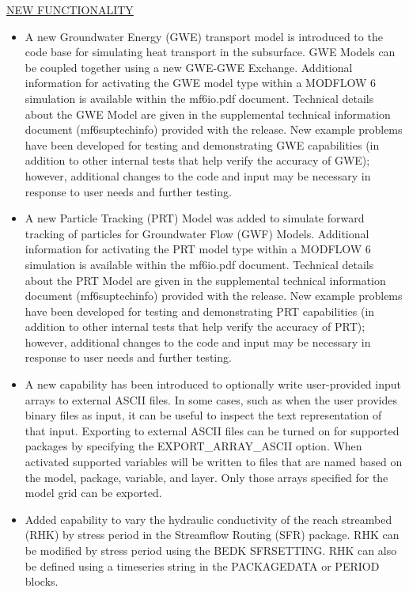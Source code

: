 	
	\item \currentmodflowversion
	
	\underline{NEW FUNCTIONALITY}
	\begin{itemize}
		\item A new Groundwater Energy (GWE) transport model is introduced to the code base for simulating heat transport in the subsurface.  GWE Models can be coupled together using a new GWE-GWE Exchange.  Additional information for activating the GWE model type within a MODFLOW 6 simulation is available within the mf6io.pdf document.  Technical details about the GWE Model are given in the supplemental technical information document (mf6suptechinfo) provided with the release.  New example problems have been developed for testing and demonstrating GWE capabilities (in addition to other internal tests that help verify the accuracy of GWE); however, additional changes to the code and input may be necessary in response to user needs and further testing.
		\item A new Particle Tracking (PRT) Model was added to simulate forward tracking of particles for Groundwater Flow (GWF) Models.  Additional information for activating the PRT model type within a MODFLOW 6 simulation is available within the mf6io.pdf document.  Technical details about the PRT Model are given in the supplemental technical information document (mf6suptechinfo) provided with the release. New example problems have been developed for testing and demonstrating PRT capabilities (in addition to other internal tests that help verify the accuracy of PRT); however, additional changes to the code and input may be necessary in response to user needs and further testing.
		\item A new capability has been introduced to optionally write user-provided input arrays to external ASCII files.  In some cases, such as when the user provides binary files as input, it can be useful to inspect the text representation of that input.  Exporting to external ASCII files can be turned on for supported packages by specifying the EXPORT\_ARRAY\_ASCII option.  When activated supported variables will be written to files that are named based on the model, package, variable, and layer.  Only those arrays specified for the model grid can be exported.
		\item Added capability to vary the hydraulic conductivity of the reach streambed (RHK) by stress period in the Streamflow Routing (SFR) package. RHK can be modified by stress period using the BEDK SFRSETTING. RHK can also be defined using a timeseries string in the PACKAGEDATA or PERIOD blocks.

\end{itemize}
